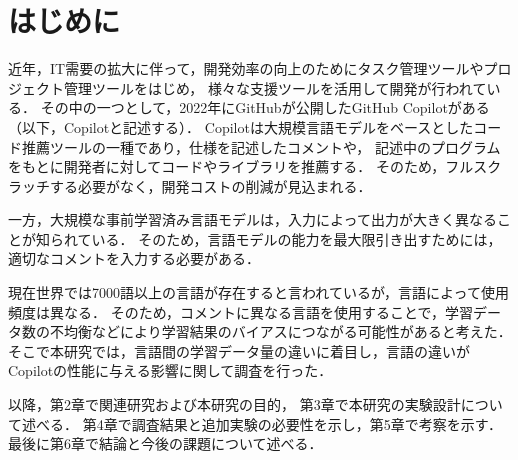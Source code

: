 \section{はじめに\label{intro}}
    近年，IT需要の拡大に伴って，開発効率の向上のためにタスク管理ツールやプロジェクト管理ツールをはじめ，
    様々な支援ツールを活用して開発が行われている．
    その中の一つとして，2022年にGitHubが公開したGitHub Copilotがある（以下，Copilotと記述する）．
    Copilotは大規模言語モデルをベースとしたコード推薦ツールの一種であり，仕様を記述したコメントや，
    記述中のプログラムをもとに開発者に対してコードやライブラリを推薦する．
    そのため，フルスクラッチする必要がなく，開発コストの削減が見込まれる．

    一方，大規模な事前学習済み言語モデルは，入力によって出力が大きく異なることが知られている\cite{Yao2022ACL}．
    そのため，言語モデルの能力を最大限引き出すためには，適切なコメントを入力する必要がある．
    
    現在世界では7000語以上の言語が存在する\cite{Ethnologue}と言われているが，言語によって使用頻度は異なる．
    そのため，コメントに異なる言語を使用することで，学習データ数の不均衡などにより学習結果のバイアスにつながる可能性があると考えた．
    そこで本研究では，言語間の学習データ量の違いに着目し，言語の違いがCopilotの性能に与える影響に関して調査を行った．

    以降，第2章で関連研究および本研究の目的，
    第3章で本研究の実験設計について述べる．
    第4章で調査結果と追加実験の必要性を示し，第5章で考察を示す．
    最後に第6章で結論と今後の課題について述べる．
